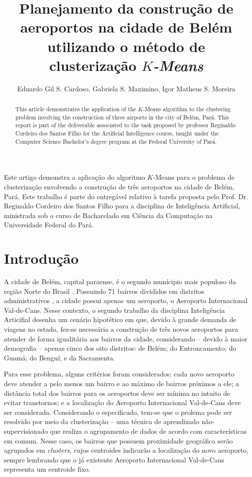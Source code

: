 \documentclass[12pt]{article}
\title{Planejamento da construção de aeroportos na cidade de Belém utilizando o método de clusterização \textit{$K$-Means}}
\author{Eduardo Gil S. Cardoso\inst{1}, Gabriela S. Maximino\inst{1}, Igor Matheus S. Moreira\inst{1} }
\begin{document}
\maketitle

\begin{abstract}
  This article demonstrates the application of the $K$-Means algorithm to the clustering problem involving the construction of three airports in the city of Belém, Pará. This report is part of the deliverable associated to the task proposed by professor Reginaldo Cordeiro dos Santos Filho for the Artificial Intelligence course, taught under the Computer Science Bachelor's degree program at the Federal University of Pará.
\end{abstract}
     
\begin{resumo} 
  Este artigo demonstra a aplicação do algoritmo $K$-Means para o problema de clusterização envolvendo a construção de três aeroportos na cidade de Belém, Pará. Este trabalho é parte do entregável relativo à tarefa proposta pelo Prof. Dr. Reginaldo Cordeiro dos Santos Filho para a disciplina de Inteligência Artificial, ministrada sob o curso de Bacharelado em Ciência da Computação na Universidade Federal do Pará.
\end{resumo}



\section{Introdução} %



A cidade de Belém, capital paraense, é o segundo munícipio mais populoso da região Norte do Brasil \cite{ibge}. Possuindo 71 bairros divididos em distritos administrativos \cite{belemwiki}, a cidade possui apenas um aeroporto, o Aeroporto Internacional Val-de-Cans. Nesse contexto, o segundo trabalho da disciplina Inteligência Articifial desenha um cenário hipotético em que, devido à grande demanda de viagens no estado, fez-se necessária a construção de três novos aeroportos para atender de forma igualitária aos bairros da cidade, considerando -- devido à maior demografia -- apenas cinco dos oito distritos: de Belém; do Entroncamento; do Guamá; do Benguí; e da Sacramenta.

Para esse problema, alguns critérios foram considerados: cada novo aeroporto deve atender a pelo menos um bairro e ao máximo de bairros próximos a ele; a distância total dos bairros para os aeroportos deve ser mínima no intuito de evitar transtornos; e a localização do Aeroporto Internacional Val-de-Cans deve ser considerada. Considerando o especificado, tem-se que o prolema pode ser resolvido por meio da clusterização -- uma técnica de aprendizado não-supervisionado que realiza o agrupamento de dados de acordo com características em comum. Nesse caso, os bairros que possuem proximidade geográfica serão agrupados em \textit{clusters}, cujos centroides indicarão a localização do novo aeroporto, sempre lembrando que o já existente Aeroporto Internacional Val-de-Cans representa um centroide fixo.
\end{document}
